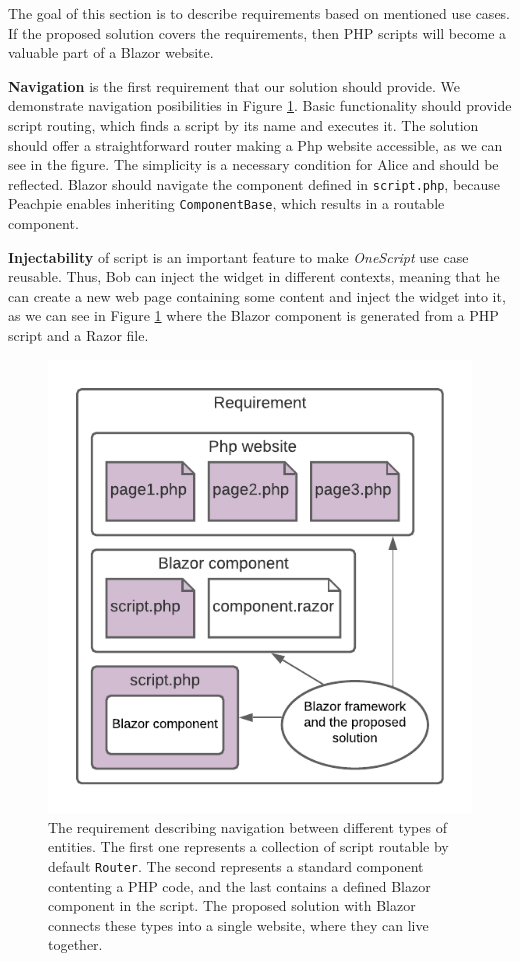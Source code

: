 The goal of this section is to describe requirements based on mentioned use cases.
If the proposed solution covers the requirements, then PHP scripts will become a valuable part of a Blazor website.
\par
\textbf{Navigation} is the first requirement that our solution should provide.
We demonstrate navigation posibilities in Figure \ref{img10:scripts}.
Basic functionality should provide script routing, which finds a script by its name and executes it.
The solution should offer a straightforward router making a Php website accessible, as we can see in the figure.
The simplicity is a necessary condition for Alice and should be reflected.
Blazor should navigate the component defined in \texttt{script.php}, because Peachpie enables inheriting \texttt{ComponentBase}, which results in a routable component.
\par
\textbf{Injectability} of script is an important feature to make \textit{OneScript} use case reusable.
Thus, Bob can inject the widget in different contexts, meaning that he can create a new web page containing some content and inject the widget into it, as we can see in Figure \ref{img10:scripts} where the Blazor component is generated from a PHP script and a Razor file.
\par
\begin{figure}[t]\centering
\includegraphics{./img/Requirement}
\caption{The requirement describing navigation between different types of entities. 
The first one represents a collection of script routable by default \texttt{Router}.
The second represents a standard component contenting a PHP code, and the last contains a defined Blazor component in the script.
The proposed solution with Blazor connects these types into a single website, where they can live together.
}
\label{img10:scripts}
\end{figure} 
